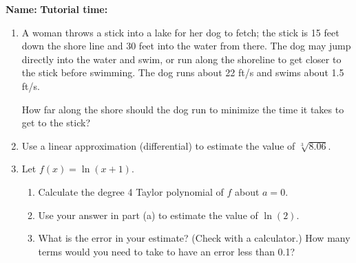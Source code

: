 \documentclass[12pt]{article}
\begin{document}
{\bf \large Name:} \hspace{2.5in} {\bf Tutorial time:}

\bigskip

\bigskip

\thispagestyle{fancy}

\begin{enumerate}
 \item A woman throws a stick into a lake for her dog to fetch; the stick is 15 feet down the shore line and 30 feet into the water from there. The dog may jump directly into the water and swim, or run along the shoreline to get closer to the stick before swimming. The dog runs about 22 ft/s and swims about 1.5 ft/s.

How far along the shore should the dog run to minimize the time it takes to get to the stick?

\vspace{4in}

 \item Use a linear approximation (differential) to estimate the value of $\sqrt[3]{8.06}$.

\newpage

 \item Let $f(x) = \ln(x+1)$.
\begin{enumerate}
 \item Calculate the degree 4 Taylor polynomial of $f$ about $a=0$.

\vspace{3in}

 \item Use your answer in part (a) to estimate the value of $\ln(2)$.

\vspace{2.5in}

 \item What is the error in your estimate? (Check with a calculator.) How many terms would you need to take to have an error less than 0.1?
\end{enumerate}

\end{enumerate}
 
\end{document}
